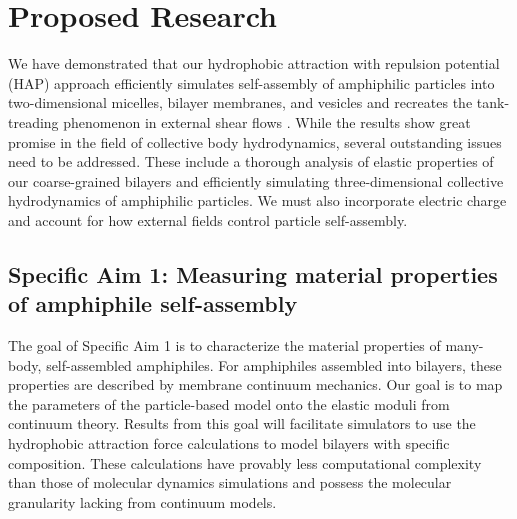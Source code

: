 \section{Proposed Research}
\label{sec:proposed-work}
We have demonstrated that our hydrophobic attraction with repulsion
potential (HAP) approach efficiently simulates self-assembly of
amphiphilic particles into two-dimensional micelles, bilayer membranes,
and vesicles \cite{Fu2018_SIAM} and recreates the tank-treading
phenomenon in external shear flows \cite{FuQuRyYo20}.
While the results show great promise in the field of collective body
hydrodynamics, several outstanding issues need to be addressed. These
include a thorough analysis of elastic properties of our coarse-grained
bilayers and efficiently simulating three-dimensional collective
hydrodynamics of amphiphilic particles.
We must also incorporate electric charge and account
for how external fields control particle self-assembly. 

\subsection{Specific Aim 1: Measuring material properties of amphiphile self-assembly}
\label{subsec:specific_aim_1}

The goal of Specific Aim 1 is to characterize the material properties of
many-body, self-assembled amphiphiles.  For amphiphiles assembled into
bilayers, these properties are described by membrane continuum
mechanics.  Our goal is to map the parameters of the particle-based
model onto the elastic moduli from continuum theory.  Results from this
goal will facilitate simulators to use the hydrophobic attraction force
calculations to model bilayers with specific composition. These
calculations have provably less computational complexity than those of
molecular dynamics simulations and possess the molecular granularity
lacking from continuum models.


